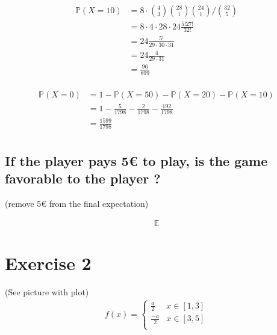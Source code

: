 \documentclass{article}
\renewcommand{\P}{\mathbb{P}}
\newcommand{\E}{\mathbb{E}}
\begin{document}
\begin{align*}
    \P (X=10)
    & = 8 \cdot {4 \choose 3} {28 \choose 1} {24 \choose 1} / {32 \choose 5} \\
    & = 8 \cdot 4 \cdot 28 \cdot 24 \frac{5!27!}{32!} \\
    & = 24 \frac{5!}{29 \cdot 30 \cdot 31} \\
    & = 24 \frac{4}{29 \cdot 31} \\
    & = \frac{96}{899} \\
\end{align*}

\begin{align*}
    \P (X=0)
    & = 1 - \P (X=50) - \P (X=20) - \P (X=10) \\
    & = 1 - \frac{5}{1798} - \frac{2}{1798} - \frac{192}{1798} \\
    & = \frac{1599}{1798} \\
\end{align*}

\subsection{If the player pays 5€ to play, is the game favorable to the player ?}
(remove 5€ from the final expectation)

\begin{align*}
    \E
\end{align*}

\section{Exercise 2}
 (See picture with plot)
\begin{align*}
    f(x) =
    \begin{cases}
        \frac{a}{2}  & x \in [1, 3] \\
        \frac{-a}{2} & x \in [3, 5] \\
    \end{cases}
\end{align*}
\end{document}
